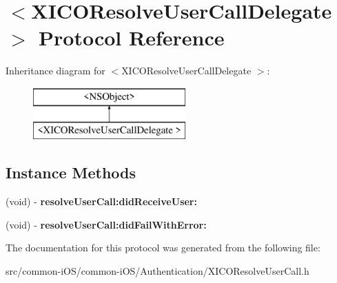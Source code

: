 \hypertarget{protocol_x_i_c_o_resolve_user_call_delegate_01-p}{}\section{$<$X\+I\+C\+O\+Resolve\+User\+Call\+Delegate $>$ Protocol Reference}
\label{protocol_x_i_c_o_resolve_user_call_delegate_01-p}
Inheritance diagram for $<$X\+I\+C\+O\+Resolve\+User\+Call\+Delegate $>$\+:\begin{figure}[H]
\begin{center}
\leavevmode
\includegraphics[height=2.000000cm]{protocol_x_i_c_o_resolve_user_call_delegate_01-p}
\end{center}
\end{figure}
\subsection*{Instance Methods}
\begin{DoxyCompactItemize}
\item 
\hypertarget{protocol_x_i_c_o_resolve_user_call_delegate_01-p_a73168f2ffd36f69931fc67e676917ce8}{}\label{protocol_x_i_c_o_resolve_user_call_delegate_01-p_a73168f2ffd36f69931fc67e676917ce8} 
(void) -\/ {\bfseries resolve\+User\+Call\+:did\+Receive\+User\+:}
\item 
\hypertarget{protocol_x_i_c_o_resolve_user_call_delegate_01-p_a5f1c716674bc2c2786141e69d4a99ef3}{}\label{protocol_x_i_c_o_resolve_user_call_delegate_01-p_a5f1c716674bc2c2786141e69d4a99ef3} 
(void) -\/ {\bfseries resolve\+User\+Call\+:did\+Fail\+With\+Error\+:}
\end{DoxyCompactItemize}


The documentation for this protocol was generated from the following file\+:\begin{DoxyCompactItemize}
\item 
src/common-\/i\+O\+S/common-\/i\+O\+S/\+Authentication/X\+I\+C\+O\+Resolve\+User\+Call.\+h\end{DoxyCompactItemize}
